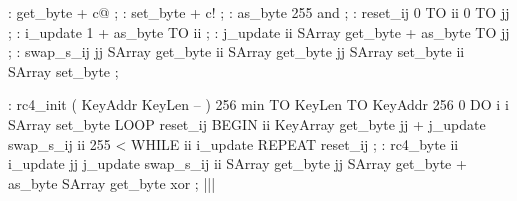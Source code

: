   : get_byte      + c@ ;
  : set_byte      + c! ;
  : as_byte       255 and ;
  : reset_ij      0 TO ii   0 TO jj ;
  : i_update      1 +   as_byte TO ii ;
  : j_update      ii SArray get_byte +   as_byte TO jj ;
  : swap_s_ij
      jj SArray get_byte
         ii SArray get_byte  jj SArray set_byte
      ii SArray set_byte
  ;

  : rc4_init ( KeyAddr KeyLen -- )
      256 min TO KeyLen   TO KeyAddr
      256 0 DO   i i SArray set_byte   LOOP
      reset_ij
      BEGIN
          ii KeyArray get_byte   jj +  j_update
          swap_s_ij
          ii 255 < WHILE
          ii i_update
      REPEAT
      reset_ij
  ;
  : rc4_byte
      ii i_update   jj j_update
      swap_s_ij
      ii SArray get_byte   jj SArray get_byte +   as_byte SArray get_byte  xor
  ;
|||
\typeout{\result}

\stop